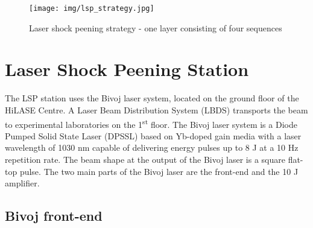 \begin{figure}[h]
    \centering
    \texttt{[image: img/lsp\_strategy.jpg]}
    \caption{Laser shock peening strategy - one layer consisting of four sequences}
    \label{fig:lspstrategy}
\end{figure}

\section{Laser Shock Peening Station}

The LSP station uses the Bivoj laser system, located on the ground floor of the HiLASE Centre. A Laser Beam Distribution System (LBDS) transports the beam to
experimental laboratories on the 1\textsuperscript{st} floor. The Bivoj laser
system is a Diode Pumped Solid State Laser (DPSSL) based on
Yb-doped gain media with a laser wavelength of 1030 nm
capable of delivering energy pulses up to 8 J at a 10 Hz
repetition rate. The beam shape at the output of the Bivoj laser is a
square flat-top pulse. The two main parts of the Bivoj laser are
the front-end and the 10 J amplifier.

\subsection{Bivoj front-end}

